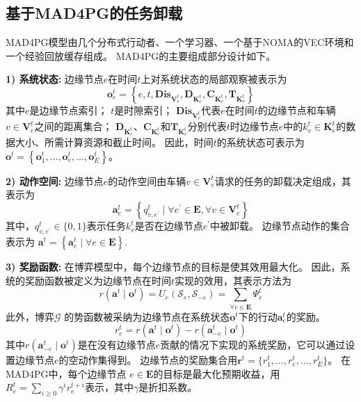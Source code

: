 \subsection{基于MAD4PG的任务卸载}
MAD4PG模型由几个分布式行动者、一个学习器、一个基于NOMA的VEC环境和一个经验回放缓存组成。
MAD4PG的主要组成部分设计如下。

\textbf{1) 系统状态:} 边缘节点$e$在时间$t$上对系统状态的局部观察被表示为
	\begin{equation}
		\boldsymbol{o}_{e}^{t}=\left\{e, t, \mathbf{Dis}_{\mathbf{V}_{e}^{t}}, \mathbf{D}_{\mathbf{K}_{e}^{t}}, \mathbf{C}_{\mathbf{K}_{e}^{t}}, \mathbf{T}_{\mathbf{K}_{v}^{t}}\right\}
	\end{equation} 
	\noindent 其中$e$是边缘节点索引；
	$t$是时隙索引；
	$\mathbf{Dis}_{\mathbf{V}_{e}^{t}}$代表$e$在时间$t$的边缘节点和车辆$v \in \mathbf{V}_{e}^{t}$之间的距离集合；
	$\mathbf{D}_{\mathbf{K}_{e}^{t}}$、$\mathbf{C}_{\mathbf{K}_{e}^{t}}$和$\mathbf{T}_{\mathbf{K}_{v}^{t}}$分别代表$t$时边缘节点$e$中的$k_{v}^{t} \in \mathbf{K}_{e}^{t}$的数据大小、所需计算资源和截止时间。
	因此，时间$t$的系统状态可表示为$\boldsymbol{o}^{t}=\left\{\boldsymbol{o}_{1}^{t}, \ldots, \boldsymbol{o}_{e}^{t}, \ldots, \boldsymbol{o}_{E}^{t}\right\}$。

\textbf{2) 动作空间:} 边缘节点$e$的动作空间由车辆$v \in \mathbf{V}_{e}^{t}$请求的任务的卸载决定组成，其表示为
	\begin{equation}
		\boldsymbol{a}_{e}^{t} = \left\{ q_{v, e^{\prime}}^t \mid \forall e^{\prime} \in \mathbf{E}, \forall v \in \mathbf{V}_{e}^{t} \right\}
	\end{equation}
	\noindent 其中，$q_{v, e^{\prime}}^t \in \{0, 1\}$表示任务$k_{v}^t$是否在边缘节点$e^{\prime}$中被卸载。
	边缘节点动作的集合表示为 $\boldsymbol{a}^{t} = \left\{\boldsymbol{a}_{e}^{t}\mid \forall e \in \mathbf{E} \right\}$.
	
\textbf{3) 奖励函数:} 在博弈模型中，每个边缘节点的目标是使其效用最大化。
	因此，系统的奖励函数被定义为边缘节点在时间$t$实现的效用，其表示方法为
	\begin{equation}
		r\left(\boldsymbol{a}^{t} \mid \boldsymbol{o}^{t}\right)= {U}_{e}\left(\mathcal{S}_{e}, \mathcal{S}_{-e}\right) = \sum_{\forall e \in \mathbf{E}} \Psi_{e}^{t}
		\label{equ 4-32}
	\end{equation}
	此外，博弈$\mathcal{G}$ 的势函数被采纳为边缘节点在系统状态$\boldsymbol{o}^{t}$下的行动$\boldsymbol{a}_{e}^{t}$的奖励。
	\begin{equation}
		r_{e}^{t} = r\left(\boldsymbol{a}^{t} \mid \boldsymbol{o}^{t}\right)-r\left(\boldsymbol{a}_{-e}^{t} \mid \boldsymbol{o}^{t}\right)
		\label{equ 4-33}
	\end{equation}
	\noindent 其中$r\left(\boldsymbol{a}_{-e}^{t} \mid \boldsymbol{o}^{t}\right)$是在没有边缘节点$e$贡献的情况下实现的系统奖励，它可以通过设置边缘节点$e$的空动作集得到。
	边缘节点的奖励集合用$\boldsymbol{r}^{t} = \{r_{1}^{t}, \ldots, r_{e}^{t}, \ldots, r_{E}^{t}\}$。
	在MAD4PG中，每个边缘节点 $e \in \mathbf{E}$的目标是最大化预期收益，用$R_{e}^{t} = \sum_{i \geq 0} \gamma^{i} r_{e}^{t+i}$表示，其中$\gamma$是折扣系数。

